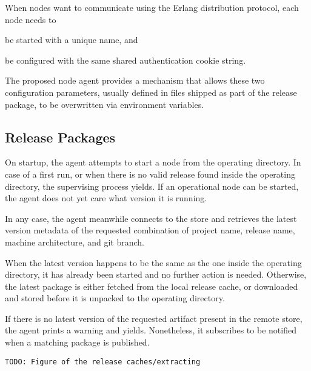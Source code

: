 When nodes want to communicate using the Erlang distribution protocol, each node needs to \begin{enumerate*}[label=(\roman*)] \item be started with a unique name, and \item be configured with the same shared authentication cookie string.\end{enumerate*} The proposed node agent provides a mechanism that allows these two configuration parameters, usually defined in files shipped as part of the release package, to be overwritten via environment variables.


\cleardoublepage
\subsection{Release Packages}

On startup, the agent attempts to start a node from the operating directory. In case of a first run, or when there is no valid release found inside the operating directory, the supervising process yields. If an operational node can be started, the agent does not yet care what version it is running.

In any case, the agent meanwhile connects to the store and retrieves the latest version metadata of the requested combination of project name, release name, machine architecture, and git branch.

When the latest version happens to be the same as the one inside the operating directory, it has already been started and no further action is needed. Otherwise, the latest package is either fetched from the local release cache, or downloaded and stored before it is unpacked to the operating directory.

If there is no latest version of the requested artifact present in the remote store, the agent prints a warning and yields. Nonetheless, it subscribes to be notified when a matching package is published.

\lstinline|TODO: Figure of the release caches/extracting|

